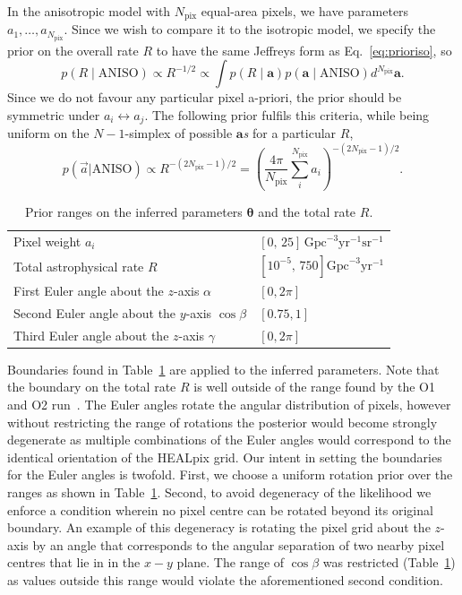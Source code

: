 \documentclass[usenatbib,useAMS]{mnras}
\newcommand{\Npix}{\ensuremath{N_\mathrm{pix}}}
\begin{document}
In the anisotropic model with $\Npix$ equal-area pixels, we have parameters
$a_1, \ldots, a_{\Npix}$. Since we wish to compare it to the isotropic model, we
specify the prior on the overall rate $R$ to have the same Jeffreys form as
Eq.~\ref{eq:prioriso}, so
%
\begin{equation}
	p\left(R \mid \mathrm{ANISO}\right)
    \propto
    R^{-1/2}
    \propto
	\int p\left(R \mid \bm{a}\right)
	p\left(\bm{a} \mid \mathrm{ANISO}\right) d^{\Npix}\bm{a}.
\end{equation}
%
Since we do not favour any particular pixel a-priori, the prior should be symmetric
under $a_i\leftrightarrow a_j$. The following prior fulfils this criteria, while being
uniform on the $N-1$-simplex of possible $\bm{a}$\textit{s} for a particular
$R$,
% 
\begin{equation}\label{eq:prioraniso}
	p(\vec{a}|\mathrm{ANISO})
	\propto
	R^{-(2\Npix-1)/2}
	=
	\left( \frac{4\pi}{\Npix} \sum_{i}^{\Npix} a_i\right)^{-(2\Npix-1)/2}.
\end{equation}

% 
\begin{table}
\centering
\begin{tabular}{l l} 
    \hline\hline
    Pixel weight $a_i$ & $\left[0,\,25\right]\,\mathrm{Gpc}^{-3}\mathrm{yr}^{-1}\mathrm{sr}^{-1}$\\
    Total astrophysical rate $R$ & $\left[10^{-5},\,750\right]\mathrm{Gpc}^{-3}\mathrm{yr}^{-1}$
    \\
    First Euler angle about the $z$-axis $\alpha$ & $\left[0,2\pi\right]$
    \\
    Second Euler angle about the $y$-axis $\cos\beta$ & $\left[0.75, 1\right]$
    \\
    Third Euler angle about the $z$-axis $\gamma$ & $\left[0,2\pi\right]$\\
    \hline\hline
\end{tabular}
\caption{Prior ranges on the inferred parameters $\bm{\theta}$ and the total rate $R$.}
\label{table:boundaries}
\end{table}

% 
Boundaries found in Table~\ref{table:boundaries} are applied to the inferred
parameters. Note that the boundary on the total rate $R$ is well outside of the
range found by the O1 and O2 run~\citep{O2populations}. The Euler angles rotate
the angular distribution of pixels, however without restricting the range of
rotations the posterior would become strongly degenerate as multiple
combinations of the Euler angles would correspond to the identical orientation
of the HEALpix grid. Our intent in setting the boundaries for the Euler angles
is twofold. First, we choose a uniform rotation prior over the ranges as shown
in Table~\ref{table:boundaries}. Second, to avoid degeneracy of the likelihood we enforce
a condition wherein no pixel centre can be rotated beyond its original boundary.
An example of this degeneracy is rotating the pixel grid about the $z$-axis by
an angle that corresponds to the angular separation of two nearby pixel centres
that lie in in the $x-y$ plane. The range of $\cos\beta$ was restricted
(Table~\ref{table:boundaries}) as values outside this range would violate the
aforementioned second condition.
\end{document}
